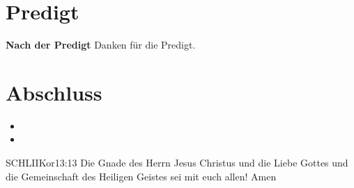 \documentclass[fontsize=14pt]{../../inc/mybib}
\begin{document}
\section{Predigt}
\textbf{Nach der Predigt}\newline
Danken für die Predigt.
\section{Abschluss}
\begin{itemize}
    \item [] 
    \item [] \beten{}
\end{itemize}
\begin{bibelbox}{SCHL}{IIKor}{13:13}
    Die Gnade des Herrn Jesus Christus und die Liebe Gottes und die Gemeinschaft des Heiligen Geistes sei mit euch allen! Amen
\end{bibelbox}
\end{document}
